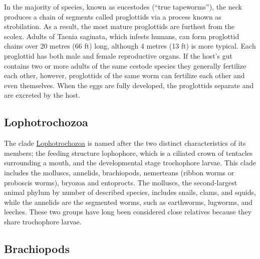 In the majority of species, known as eucestodes (``true tapeworms''), the neck produces a chain of segments called proglottids via a process known as strobilation. As a result, the most mature proglottids are furthest from the scolex. Adults of Taenia saginata, which infests humans, can form proglottid chains over 20 metres (66 ft) long, although 4 metres (13 ft) is more typical. Each proglottid has both male and female reproductive organs. If the host's gut contains two or more adults of the same cestode species they generally fertilize each other, however, proglottids of the same worm can fertilize each other and even themselves. When the eggs are fully developed, the proglottids separate and are excreted by the host.

\hypertarget{lophotrochozoa}{%
\subsection{Lophotrochozoa}\label{lophotrochozoa}}

The clade \href{https://en.wikipedia.org/wiki/Lophotrochozoa}{Lophotrochozoa} is named after the two distinct characteristics of its members; the feeding structure lophophore, which is a ciliated crown of tentacles surrounding a mouth, and the developmental stage trochophore larvae. This clade includes the molluscs, annelids, brachiopods, nemerteans (ribbon worms or proboscis worms), bryozoa and entoprocts. The molluscs, the second-largest animal phylum by number of described species, includes snails, clams, and squids, while the annelids are the segmented worms, such as earthworms, lugworms, and leeches. These two groups have long been considered close relatives because they share trochophore larvae.

\hypertarget{brachiopods}{%
\subsection{Brachiopods}\label{brachiopods}}

